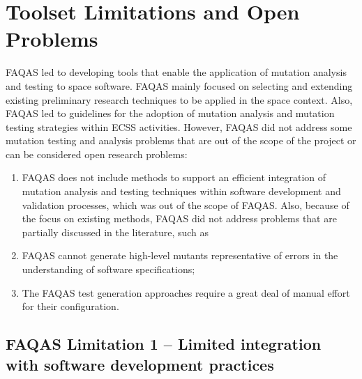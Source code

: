 \STARTCHANGEDWPT

\section{Toolset Limitations and Open Problems}
\label{sec:limitations}

FAQAS led to developing tools that enable the application of mutation analysis and testing to space software. FAQAS mainly focused on selecting and extending existing preliminary research techniques to be applied in the space context. Also, FAQAS led to guidelines for the adoption of mutation analysis and mutation testing strategies within ECSS activities. However, FAQAS did not address some mutation testing and analysis problems that are out of the scope of the project or can be considered open research problems:
\begin{enumerate}
\item FAQAS does not include methods to support an efficient integration of mutation analysis and testing techniques within software development and validation processes, which was out of the scope of FAQAS. Also, because of the focus on existing methods, FAQAS did not address problems that are partially discussed in the literature, such as
\item FAQAS cannot generate high-level mutants representative of errors in the understanding of software specifications;
\item The FAQAS test generation approaches require a great deal of manual effort for their configuration.
\end{enumerate}

\subsection{FAQAS Limitation 1 – Limited integration with software development practices}

